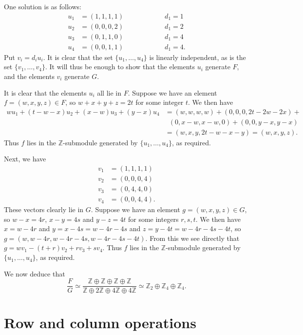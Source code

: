 \documentclass{amsart}
\newcommand{\Z}         {{\mathbb{Z}}}
\newcommand{\op}        {\oplus}
\renewcommand{\:}{\colon}
\theoremstyle{definition}
\renewenvironment{solution}{\SolutionAtEnd}{\endSolutionAtEnd}
\begin{document}
\begin{solution}
 One solution is as follows:
 \begin{align*}
  u_1 &= (1,1,1,1) \hspace{6em} d_1=1 \\
  u_2 &= (0,0,0,2) \hspace{6em} d_1=2 \\
  u_3 &= (0,1,1,0) \hspace{6em} d_1=4 \\
  u_4 &= (0,0,1,1) \hspace{6em} d_1=4.
 \end{align*}
 Put $v_i=d_iu_i$.  It is clear that the set $\{u_1,\ldots,u_4\}$ is
 linearly independent, as is the set $\{v_1,\ldots,v_4\}$.  It will
 thus be enough to show that the elements $u_i$ generate $F$, and the
 elements $v_i$ generate $G$.

 It is clear that the elements $u_i$ all lie in $F$.  Suppose we have
 an element $f=(w,x,y,z)\in F$, so $w+x+y+z=2t$ for some integer $t$.
 We then have 
 \begin{align*}
  wu_1 + (t-w-x)u_2 + (x-w)u_3 + (y-x)u_4 &=
   (w,w,w,w)+(0,0,0,2t-2w-2x)+ \\
  &\;\; (0,x-w,x-w,0)+(0,0,y-x,y-x) \\
  &= (w,x,y,2t-w-x-y) = (w,x,y,z).
 \end{align*}
 Thus $f$ lies in the $\Z$-submodule generated by
 $\{u_1,\ldots,u_4\}$, as required.

 Next, we have
 \begin{align*}
  v_1 &= (1,1,1,1) \\
  v_2 &= (0,0,0,4) \\
  v_3 &= (0,4,4,0) \\
  v_4 &= (0,0,4,4).
 \end{align*}
 These vectors clearly lie in $G$.  Suppose we have an element
 $g=(w,x,y,z)\in G$, so $w-x=4r$, $x-y=4s$ and $y-z=4t$ for some
 integers $r,s,t$.  We then have $x=w-4r$ and $y=x-4s=w-4r-4s$ and
 $z=y-4t=w-4r-4s-4t$, so $g=(w,w-4r,w-4r-4s,w-4r-4s-4t)$.  From this
 we see directly that $g=wv_1-(t+r)v_2+rv_3+sv_4$.  Thus $f$ lies in
 the $\Z$-submodule generated by $\{u_1,\ldots,u_4\}$, as required.

 We now deduce that 
 \[ \frac{F}{G}\simeq
    \frac{\Z\op\Z\op\Z\op\Z}{\Z\op2\Z\op4\Z\op4\Z}\simeq
    \Z_2\op\Z_4\op\Z_4.
 \]
\end{solution}

\section{Row and column operations}
\label{sec-col-ops}
\end{document}
